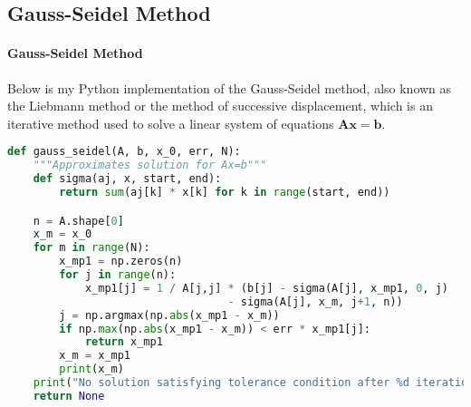 \subsection{Gauss-Seidel Method}

\paragraph{Gauss-Seidel Method} Below is my Python implementation of the Gauss-Seidel method,
also known as the Liebmann method or the method of successive displacement, which is an iterative method used to solve a linear system of equations $\bm{Ax}=\bm{b}$. 
\begin{lstlisting}[language=python]
def gauss_seidel(A, b, x_0, err, N):
    """Approximates solution for Ax=b"""
    def sigma(aj, x, start, end):
        return sum(aj[k] * x[k] for k in range(start, end))

    n = A.shape[0]
    x_m = x_0
    for m in range(N):
        x_mp1 = np.zeros(n)
        for j in range(n):
            x_mp1[j] = 1 / A[j,j] * (b[j] - sigma(A[j], x_mp1, 0, j)
                                  - sigma(A[j], x_m, j+1, n))
        j = np.argmax(np.abs(x_mp1 - x_m))
        if np.max(np.abs(x_mp1 - x_m)) < err * x_mp1[j]:
            return x_mp1
        x_m = x_mp1
        print(x_m)
    print("No solution satisfying tolerance condition after %d iterations." % N)
    return None
\end{lstlisting}
